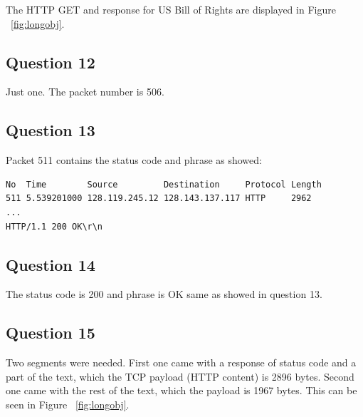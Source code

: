 \documentclass[titlepage, paper=a4, fontsize=11pt]{scrartcl} %
\numberwithin{equation}{section} %
\numberwithin{figure}{section} %
\numberwithin{table}{section} %
\begin{document}
The HTTP GET and response for US Bill of Rights are displayed in Figure ~\ref{fig:longobj}.
\\

\subsection*{Question 12}
Just one. The packet number is 506.
\\


\subsection*{Question 13}
Packet 511 contains the status code and phrase as showed:
\begin{verbatim}
No  Time        Source         Destination     Protocol Length
511	5.539201000	128.119.245.12 128.143.137.117 HTTP     2962
...
HTTP/1.1 200 OK\r\n
\end{verbatim}


\subsection*{Question 14}
The status code is 200 and phrase is OK same as showed in question 13.
\\


\subsection*{Question 15}
Two segments were needed. First one came with a response of status code and
a part of the text, which the TCP payload (HTTP content) is 2896 bytes.
Second one came with the rest of the text, which the payload is 1967 bytes.
This can be seen in Figure ~\ref{fig:longobj}.

\newpage
\end{document}
